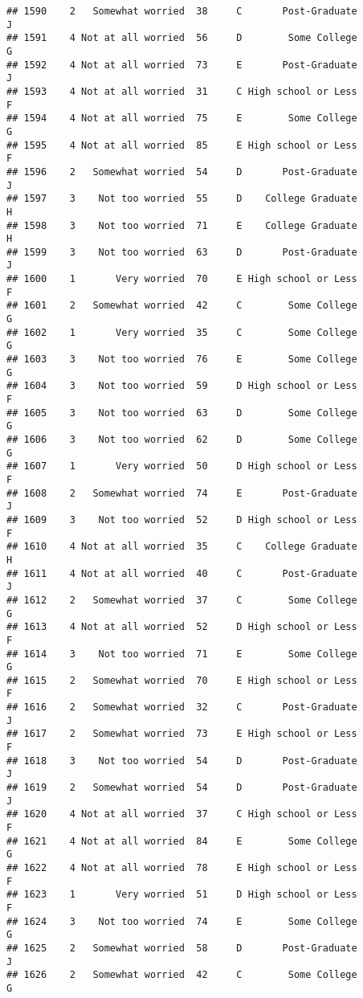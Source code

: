 \documentclass[
]{article}
\begin{document}
\begin{verbatim}
## 1590    2   Somewhat worried  38     C       Post-Graduate         J
## 1591    4 Not at all worried  56     D        Some College         G
## 1592    4 Not at all worried  73     E       Post-Graduate         J
## 1593    4 Not at all worried  31     C High school or Less         F
## 1594    4 Not at all worried  75     E        Some College         G
## 1595    4 Not at all worried  85     E High school or Less         F
## 1596    2   Somewhat worried  54     D       Post-Graduate         J
## 1597    3    Not too worried  55     D    College Graduate         H
## 1598    3    Not too worried  71     E    College Graduate         H
## 1599    3    Not too worried  63     D       Post-Graduate         J
## 1600    1       Very worried  70     E High school or Less         F
## 1601    2   Somewhat worried  42     C        Some College         G
## 1602    1       Very worried  35     C        Some College         G
## 1603    3    Not too worried  76     E        Some College         G
## 1604    3    Not too worried  59     D High school or Less         F
## 1605    3    Not too worried  63     D        Some College         G
## 1606    3    Not too worried  62     D        Some College         G
## 1607    1       Very worried  50     D High school or Less         F
## 1608    2   Somewhat worried  74     E       Post-Graduate         J
## 1609    3    Not too worried  52     D High school or Less         F
## 1610    4 Not at all worried  35     C    College Graduate         H
## 1611    4 Not at all worried  40     C       Post-Graduate         J
## 1612    2   Somewhat worried  37     C        Some College         G
## 1613    4 Not at all worried  52     D High school or Less         F
## 1614    3    Not too worried  71     E        Some College         G
## 1615    2   Somewhat worried  70     E High school or Less         F
## 1616    2   Somewhat worried  32     C       Post-Graduate         J
## 1617    2   Somewhat worried  73     E High school or Less         F
## 1618    3    Not too worried  54     D       Post-Graduate         J
## 1619    2   Somewhat worried  54     D       Post-Graduate         J
## 1620    4 Not at all worried  37     C High school or Less         F
## 1621    4 Not at all worried  84     E        Some College         G
## 1622    4 Not at all worried  78     E High school or Less         F
## 1623    1       Very worried  51     D High school or Less         F
## 1624    3    Not too worried  74     E        Some College         G
## 1625    2   Somewhat worried  58     D       Post-Graduate         J
## 1626    2   Somewhat worried  42     C        Some College         G

\end{verbatim}
\end{document}
